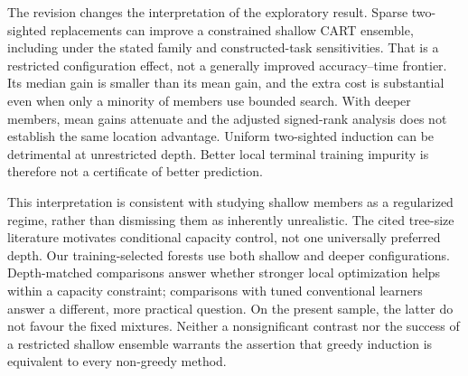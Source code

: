 The revision changes the interpretation of the exploratory result. Sparse two-sighted replacements can improve a constrained shallow CART ensemble, including under the stated family and constructed-task sensitivities. That is a restricted configuration effect, not a generally improved accuracy--time frontier. Its median gain is smaller than its mean gain, and the extra cost is substantial even when only a minority of members use bounded search. With deeper members, mean gains attenuate and the adjusted signed-rank analysis does not establish the same location advantage. Uniform two-sighted induction can be detrimental at unrestricted depth. Better local terminal training impurity is therefore not a certificate of better prediction.

This interpretation is consistent with studying shallow members as a regularized regime, rather than dismissing them as inherently unrealistic. The cited tree-size literature motivates conditional capacity control, not one universally preferred depth. Our training-selected forests use both shallow and deeper configurations. Depth-matched comparisons answer whether stronger local optimization helps within a capacity constraint; comparisons with tuned conventional learners answer a different, more practical question. On the present sample, the latter do not favour the fixed mixtures. Neither a nonsignificant contrast nor the success of a restricted shallow ensemble warrants the assertion that greedy induction is equivalent to every non-greedy method.

